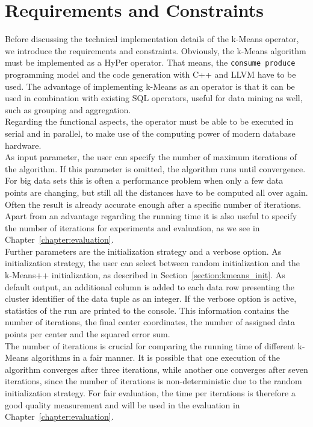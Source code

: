 \section{Requirements and Constraints}\label{section:constraint}
Before discussing the technical implementation details of the k-Means operator, we introduce the requirements and constraints. Obviously, the k-Means algorithm must be implemented as a HyPer operator. That means, the \texttt{consume produce} programming model and the code generation with C++ and LLVM have to be used. The advantage of implementing k-Means as an operator is that it can be used in combination with existing SQL operators, useful for data mining as well, such as grouping and aggregation.
\\
Regarding the functional aspects, the operator must be able to be executed in serial and in parallel, to make use of the computing power of modern database hardware.
\\
As input parameter, the user can specify the number of maximum iterations of the algorithm. If this parameter is omitted, the algorithm runs until convergence. For big data sets this is often a performance problem when only a few data points are changing, but still all the distances have to be computed all over again. Often the result is already accurate enough after a specific number of iterations. Apart from an advantage regarding the running time it is also useful to specify the number of iterations for experiments and evaluation, as we see in Chapter~\ref{chapter:evaluation}.
\\
Further parameters are the initialization strategy and a verbose option. As initialization strategy, the user can select between random initialization and the k-Means++ initialization, as described in Section~\ref{section:kmeans_init}. As default output, an additional column is added to each data row presenting the cluster identifier of the data tuple as an integer. If the verbose option is active, statistics of the run are printed to the console. This information contains the number of iterations, the final center coordinates, the number of assigned data points per center and the squared error sum. 
\\
The number of iterations is crucial for comparing the running time of different k-Means algorithms in a fair manner. It is possible that one execution of the algorithm converges after three iterations, while another one converges after seven iterations, since the number of iterations is non-deterministic due to the random initialization strategy. For fair evaluation, the time per iterations is therefore a good quality measurement and will be used in the evaluation in Chapter~\ref{chapter:evaluation}.


